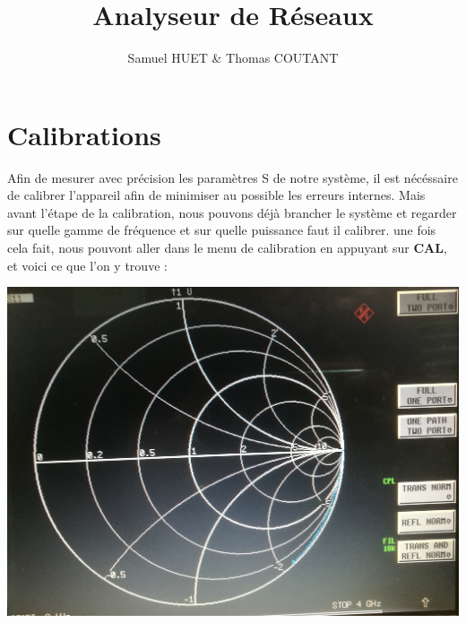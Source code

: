 \documentclass[a4paper,12pt]{report}            %
\author{Samuel HUET \& Thomas COUTANT}
\title{\huge{Analyseur de Réseaux}}
\begin{document}
\maketitle
\renewcommand{\contentsname}{SOMMAIRE} %
\tableofcontents

\chapter{Calibrations}

    Afin de mesurer avec précision les paramètres S de notre système, il est nécéssaire de
calibrer l'appareil afin de minimiser au possible les erreurs internes. Mais avant l'étape
de la calibration, nous pouvons déjà brancher le système et regarder sur quelle gamme de
fréquence et sur quelle puissance faut il calibrer. une fois cela fait, nous pouvont aller
dans le menu de calibration en appuyant sur \textbf{CAL}, et voici ce que l'on y trouve :

\begin{center}\includegraphics[scale = 0.12]{pic/Calib.jpg}\\ \end{center}
\end{document}
